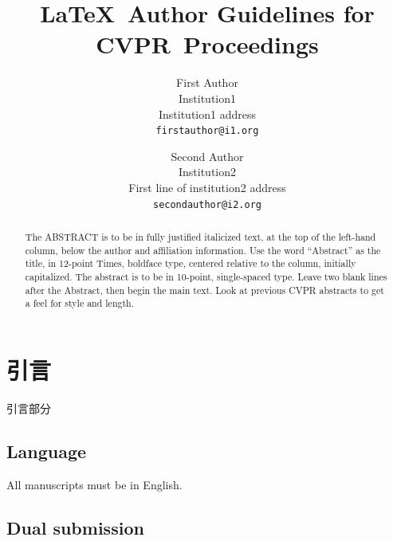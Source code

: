 \documentclass[10pt,twocolumn,letterpaper]{article}
\def\confName{CVPR}
\begin{document}
\title{\LaTeX\ Author Guidelines for \confName~Proceedings}

\author{First Author\\
Institution1\\
Institution1 address\\
{\tt\small firstauthor@i1.org}
\and
Second Author\\
Institution2\\
First line of institution2 address\\
{\tt\small secondauthor@i2.org}
}
\maketitle

\begin{abstract}
   The ABSTRACT is to be in fully justified italicized text, at the top of the left-hand column, below the author and affiliation information.
   Use the word ``Abstract'' as the title, in 12-point Times, boldface type, centered relative to the column, initially capitalized.
   The abstract is to be in 10-point, single-spaced type.
   Leave two blank lines after the Abstract, then begin the main text.
   Look at previous CVPR abstracts to get a feel for style and length.
\end{abstract}

\section{引言}
\label{sec:intro}

引言部分

\subsection{Language}

All manuscripts must be in English.

\subsection{Dual submission}
\end{document}
